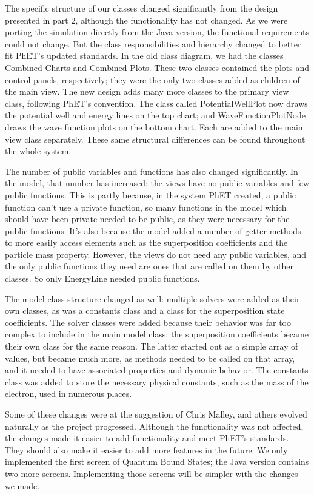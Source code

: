 The specific structure of our classes changed significantly from the design presented in part 2,
although the functionality has not changed.  As we were porting the simulation directly from the
Java version, the functional requirements could not change.  But the class responsibilities and
hierarchy changed to better fit PhET's updated standards.  In the old class diagram, we had the
classes {\ttfamily Combined Charts} and {\ttfamily Combined Plots}. These two classes contained the
plots and control panels, respectively; they were the only two classes added as children of the main
view. The new design adds many more classes to the primary view class, following PhET's convention.
The class called {\ttfamily PotentialWellPlot} now draws the potential well and energy lines on the
top chart; and {\ttfamily WaveFunctionPlotNode} draws the wave function plots on the bottom chart.
Each are added to the main view class separately.  These same structural differences can be found
throughout the whole system.

The number of public variables and functions has also changed significantly.  In the model, that
number has increased; the views have no public variables and few public functions.  This is partly
because, in the system PhET created, a public function can't use a private function, so many
functions in the model which should have been private needed to be public, as they were necessary
for the public functions.  It's also because the model added a number of getter methods to more
easily access elements such as the superposition coefficients and the particle mass property.
However, the views do not need any public variables, and the only public functions they need are
ones that are called on them by other classes.  So only {\ttfamily EnergyLine} needed public
functions.

The model class structure changed as well: multiple solvers were added as their own classes, as
was a constants class and a class for the superposition state coefficients.  The solver classes
were added because their behavior was far too complex to include in the main model class; the
superposition coefficients became their own class for the same reason.  The latter started out
as a simple array of values, but became much more, as methods needed to be called on that
array, and it needed to have associated properties and dynamic behavior.  The constants class
was added to store the necessary physical constants, such as the mass of the electron, used in
numerous places.

Some of these changes were at the suggestion of Chris Malley, and others evolved naturally as
the project progressed.  Although the functionality was not affected, the changes made it
easier to add functionality and meet PhET's standards.  They should also make it easier to add
more features in the future.  We only implemented the first screen of {\ttfamily Quantum Bound
States}; the Java version contains two more screens.  Implementing those screens will be simpler
with the changes we made.

